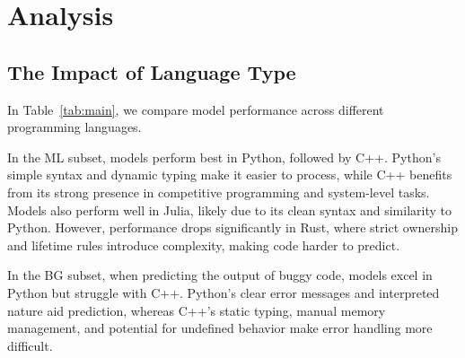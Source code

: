 \section{Analysis}


\begin{table*}[!t]
\caption{Model Performance Across Different Variables in DR}
\label{tab:dr}
\end{table*}

\subsection{The Impact of Language Type}

In Table~\ref{tab:main}, we compare model performance across different programming languages.  

In the ML subset, models perform best in Python, followed by C++. Python’s simple syntax and dynamic typing make it easier to process, while C++ benefits from its strong presence in competitive programming and system-level tasks. Models also perform well in Julia, likely due to its clean syntax and similarity to Python. However, performance drops significantly in Rust, where strict ownership and lifetime rules introduce complexity, making code harder to predict.  

In the BG subset, when predicting the output of buggy code, models excel in Python but struggle with C++. Python’s clear error messages and interpreted nature aid prediction, whereas C++'s static typing, manual memory management, and potential for undefined behavior make error handling more difficult.

